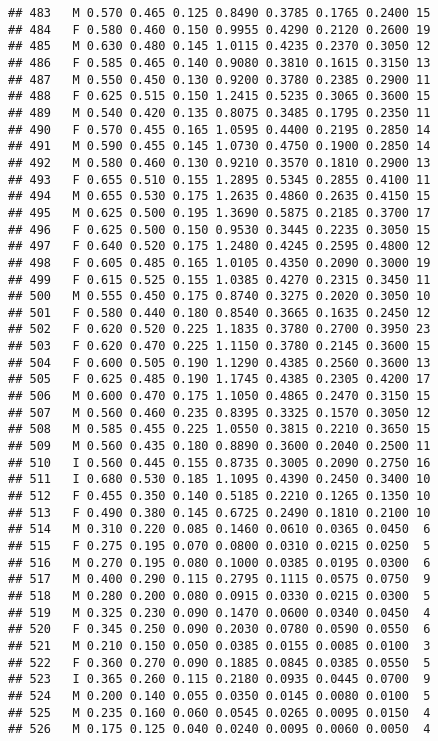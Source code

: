 \documentclass[
]{article}
\begin{document}
\begin{verbatim}
## 483   M 0.570 0.465 0.125 0.8490 0.3785 0.1765 0.2400 15
## 484   F 0.580 0.460 0.150 0.9955 0.4290 0.2120 0.2600 19
## 485   M 0.630 0.480 0.145 1.0115 0.4235 0.2370 0.3050 12
## 486   F 0.585 0.465 0.140 0.9080 0.3810 0.1615 0.3150 13
## 487   M 0.550 0.450 0.130 0.9200 0.3780 0.2385 0.2900 11
## 488   F 0.625 0.515 0.150 1.2415 0.5235 0.3065 0.3600 15
## 489   M 0.540 0.420 0.135 0.8075 0.3485 0.1795 0.2350 11
## 490   F 0.570 0.455 0.165 1.0595 0.4400 0.2195 0.2850 14
## 491   M 0.590 0.455 0.145 1.0730 0.4750 0.1900 0.2850 14
## 492   M 0.580 0.460 0.130 0.9210 0.3570 0.1810 0.2900 13
## 493   F 0.655 0.510 0.155 1.2895 0.5345 0.2855 0.4100 11
## 494   M 0.655 0.530 0.175 1.2635 0.4860 0.2635 0.4150 15
## 495   M 0.625 0.500 0.195 1.3690 0.5875 0.2185 0.3700 17
## 496   F 0.625 0.500 0.150 0.9530 0.3445 0.2235 0.3050 15
## 497   F 0.640 0.520 0.175 1.2480 0.4245 0.2595 0.4800 12
## 498   F 0.605 0.485 0.165 1.0105 0.4350 0.2090 0.3000 19
## 499   F 0.615 0.525 0.155 1.0385 0.4270 0.2315 0.3450 11
## 500   M 0.555 0.450 0.175 0.8740 0.3275 0.2020 0.3050 10
## 501   F 0.580 0.440 0.180 0.8540 0.3665 0.1635 0.2450 12
## 502   F 0.620 0.520 0.225 1.1835 0.3780 0.2700 0.3950 23
## 503   F 0.620 0.470 0.225 1.1150 0.3780 0.2145 0.3600 15
## 504   F 0.600 0.505 0.190 1.1290 0.4385 0.2560 0.3600 13
## 505   F 0.625 0.485 0.190 1.1745 0.4385 0.2305 0.4200 17
## 506   M 0.600 0.470 0.175 1.1050 0.4865 0.2470 0.3150 15
## 507   M 0.560 0.460 0.235 0.8395 0.3325 0.1570 0.3050 12
## 508   M 0.585 0.455 0.225 1.0550 0.3815 0.2210 0.3650 15
## 509   M 0.560 0.435 0.180 0.8890 0.3600 0.2040 0.2500 11
## 510   I 0.560 0.445 0.155 0.8735 0.3005 0.2090 0.2750 16
## 511   I 0.680 0.530 0.185 1.1095 0.4390 0.2450 0.3400 10
## 512   F 0.455 0.350 0.140 0.5185 0.2210 0.1265 0.1350 10
## 513   F 0.490 0.380 0.145 0.6725 0.2490 0.1810 0.2100 10
## 514   M 0.310 0.220 0.085 0.1460 0.0610 0.0365 0.0450  6
## 515   F 0.275 0.195 0.070 0.0800 0.0310 0.0215 0.0250  5
## 516   M 0.270 0.195 0.080 0.1000 0.0385 0.0195 0.0300  6
## 517   M 0.400 0.290 0.115 0.2795 0.1115 0.0575 0.0750  9
## 518   M 0.280 0.200 0.080 0.0915 0.0330 0.0215 0.0300  5
## 519   M 0.325 0.230 0.090 0.1470 0.0600 0.0340 0.0450  4
## 520   F 0.345 0.250 0.090 0.2030 0.0780 0.0590 0.0550  6
## 521   M 0.210 0.150 0.050 0.0385 0.0155 0.0085 0.0100  3
## 522   F 0.360 0.270 0.090 0.1885 0.0845 0.0385 0.0550  5
## 523   I 0.365 0.260 0.115 0.2180 0.0935 0.0445 0.0700  9
## 524   M 0.200 0.140 0.055 0.0350 0.0145 0.0080 0.0100  5
## 525   M 0.235 0.160 0.060 0.0545 0.0265 0.0095 0.0150  4
## 526   M 0.175 0.125 0.040 0.0240 0.0095 0.0060 0.0050  4

\end{verbatim}
\end{document}
